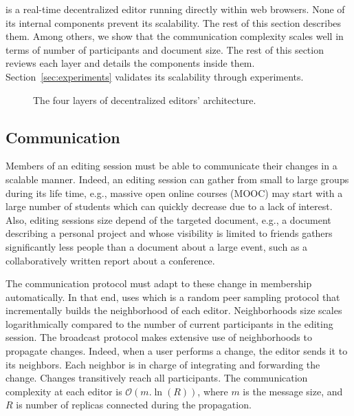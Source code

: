 \CRATE is a real-time decentralized editor running directly within web
browsers. None of its internal components prevent its scalability. The rest of
this section describes them. Among others, we show that the communication
complexity scales well in terms of number of participants and document size. The
rest of this section reviews each layer and details the components inside
them. Section~\ref{sec:experiments} validates its scalability through
experiments.

\begin{figure}
  \centering
  
  \caption{\label{fig:architecture}The four layers of decentralized editors'
    architecture.}
\end{figure}

\subsection{Communication}
\label{subsec:communication}

Members of an editing session must be able to communicate their changes in a
scalable manner. Indeed, an editing session can gather from small to large
groups during its life time, e.g., massive open online courses (MOOC) may start
with a large number of students which can quickly decrease due to a lack of
interest. Also, editing sessions size depend of the targeted document, e.g., a
document describing a personal project and whose visibility is limited to
friends gathers significantly less people than a document about a large event,
such as a collaboratively written report about a conference.

The communication protocol must adapt to these change in membership
automatically. In that end, \CRATE uses \SPRAY which is a random peer sampling
protocol that incrementally builds the neighborhood of each editor.
Neighborhoods size scales logarithmically compared to the number of current
participants in the editing session. The broadcast protocol makes extensive use
of neighborhoods to propagate changes. Indeed, when a user performs a change,
the editor sends it to its neighbors. Each neighbor is in charge of integrating
and forwarding the change. Changes transitively reach all participants. The
communication complexity at each editor is $\mathcal{O}(m.\ln(R))$, where $m$ is
the message size, and $R$ is number of replicas connected during the
propagation.



